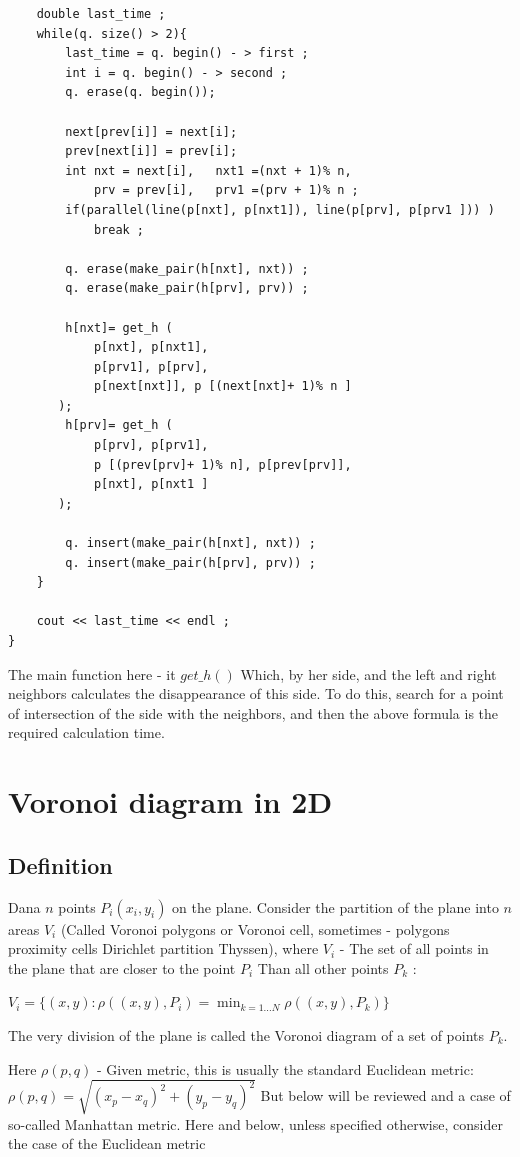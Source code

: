 \begin{verbatim}
    double last_time ;
    while(q. size() > 2){
        last_time = q. begin() - > first ;
        int i = q. begin() - > second ;
        q. erase(q. begin());
 
        next[prev[i]] = next[i];
        prev[next[i]] = prev[i];
        int nxt = next[i],   nxt1 =(nxt + 1)% n,
            prv = prev[i],   prv1 =(prv + 1)% n ;
        if(parallel(line(p[nxt], p[nxt1]), line(p[prv], p[prv1 ])) )
            break ;
 
        q. erase(make_pair(h[nxt], nxt)) ;
        q. erase(make_pair(h[prv], prv)) ;
 
        h[nxt]= get_h (
            p[nxt], p[nxt1],
            p[prv1], p[prv],
            p[next[nxt]], p [(next[nxt]+ 1)% n ]
       );
        h[prv]= get_h (
            p[prv], p[prv1],
            p [(prev[prv]+ 1)% n], p[prev[prv]],
            p[nxt], p[nxt1 ]
       );
 
        q. insert(make_pair(h[nxt], nxt)) ;
        q. insert(make_pair(h[prv], prv)) ;
    }
 
    cout << last_time << endl ;
} 
\end{verbatim}
The main function here - it $get \_h()$ Which, by her side, and the left and right neighbors calculates the disappearance of this side. To do this, search for a point of intersection of the side with the neighbors, and then the above formula is the required calculation time.

\section{ Voronoi diagram in 2D }
\subsection{ Definition }

Dana $n$ points $P_i (x_i, y_i)$ on the plane. Consider the partition of the plane into $n$ areas $V_i$ (Called Voronoi polygons or Voronoi cell, sometimes - polygons proximity cells Dirichlet partition Thyssen), where $V_i$ - The set of all points in the plane that are closer to the point $P_i$ Than all other points $P_k$ :

$V_{i}=\{(x,y):\rho((x,y),P_{i})=\min_{k=1\dots N}\rho((x,y),P_{k})\}$

The very division of the plane is called the Voronoi diagram of a set of points $P_k$.

Here $\rho (p, q)$ - Given metric, this is usually the standard Euclidean metric: $\rho (p, q) = \sqrt {(x_p-x_q) ^ 2 + (y_p-y_q) ^ 2}$ But below will be reviewed and a case of so-called Manhattan metric. Here and below, unless specified otherwise, consider the case of the Euclidean metric

